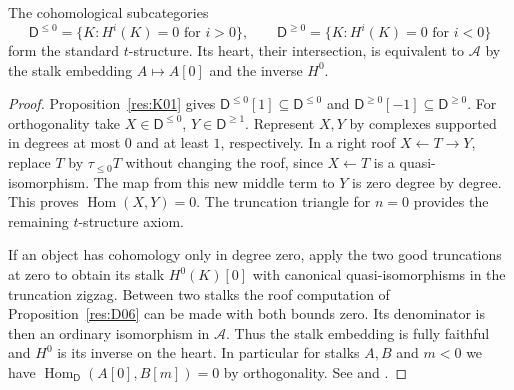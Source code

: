 \begin{theorem}\label{res:D07}
The cohomological subcategories
\[
 \mathsf D^{\le0}=\{K:H^i(K)=0\text{ for }i>0\},\qquad
 \mathsf D^{\ge0}=\{K:H^i(K)=0\text{ for }i<0\}
\]
form the standard \(t\)-structure. Its heart, their intersection, is
equivalent to \(\mathcal A\) by the stalk embedding \(A\mapsto A[0]\)
and the inverse \(H^0\).
\end{theorem}
\begin{proof}
Proposition~\ref{res:K01} gives
\(\mathsf D^{\le0}[1]\subseteq\mathsf D^{\le0}\) and
\(\mathsf D^{\ge0}[-1]\subseteq\mathsf D^{\ge0}\). For
orthogonality take \(X\in\mathsf D^{\le0}\), \(Y\in\mathsf D^{\ge1}\).
Represent \(X,Y\) by complexes supported in degrees at most \(0\)
and at least \(1\), respectively. In a right roof \(X\leftarrow T
\to Y\), replace \(T\) by \(\tau_{\le0}T\) without changing the
roof, since \(X\leftarrow T\) is a quasi-isomorphism. The map from
this new middle term to \(Y\) is zero degree by degree. This proves
\(\operatorname{Hom}(X,Y)=0\). The truncation triangle for \(n=0\)
provides the remaining \(t\)-structure axiom.

If an object has cohomology only in degree zero, apply the two good
truncations at zero to obtain its stalk \(H^0(K)[0]\) with canonical
quasi-isomorphisms in the truncation zigzag. Between two stalks
the roof computation of Proposition~\ref{res:D06} can be made
with both bounds zero. Its denominator is then an ordinary
isomorphism in \(\mathcal A\). Thus the stalk embedding is fully
faithful and \(H^0\) is its inverse on the heart. In particular for
stalks \(A,B\) and \(m<0\) we have
\(\operatorname{Hom}_{\mathsf D}(A[0],B[m])=0\) by orthogonality.
See \cite[Tags 05RV and 06XS]{stacks-derived} and
\cite[Proposition 7.5.1]{yekutieli}.
\end{proof}

